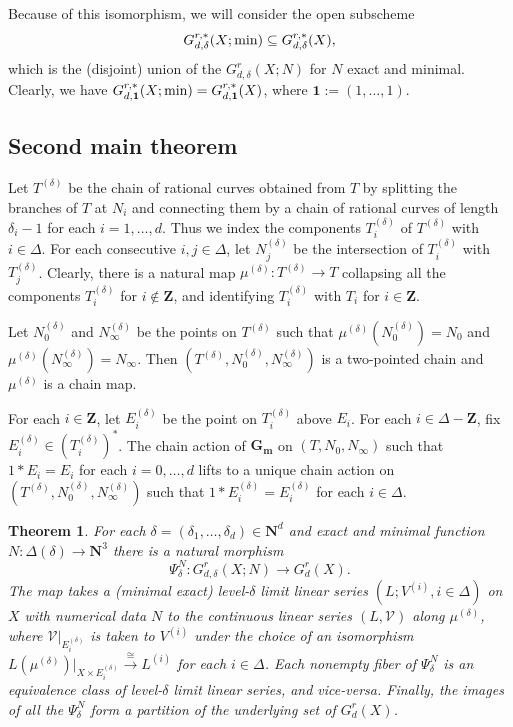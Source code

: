 \documentclass[a4paper,11pt]{amsart}
\theoremstyle{plain}
\newtheorem{thm}{Theorem}[section]
\theoremstyle{definition}
\theoremstyle{remark}
\def\cc{{\mathbf G}_{\mathbf m}}
\def\n{\mathbf{N}}
\def\V{\mathcal{V}}
\def\:{\colon}
\begin{document}
Because of this isomorphism, we will consider the open subscheme
\[
G_{d,\delta}^{r,*}(X;\text{\rm min})\subseteq G_{d,\delta}^{r,*}(X),
\]
which is the (disjoint) union of the 
$G_{d,\delta}^r(X;N)$ for $N$ exact and minimal. Clearly, we have
$G_{d,\mathbf 1}^{r,*}(X;\text{\rm min})=G_{d,\mathbf 1}^{r,*}(X)$, where $\mathbf 1:=(1,\dots,1)$.



\subsection{Second main theorem}

Let $T^{(\delta)}$ be the chain of rational curves obtained from $T$ by splitting the branches of $T$ at $N_i$ and connecting them by a chain of rational curves of length $\delta_i-1$ for each $i=1,\dots,d$. Thus we index the components $T^{(\delta)}_i$ of $T^{(\delta)}$ with $i\in\Delta$. For each consecutive  $i,j\in\Delta$, let $N^{(\delta)}_j$ be the intersection of $T^{(\delta)}_{i}$ with $T^{(\delta)}_j$. Clearly, there is a natural map $\mu^{(\delta)}\:T^{(\delta)}\to T$ collapsing all the components $T^{(\delta)}_{i}$ for $i\not\in\mathbf Z$, and identifying $T^{(\delta)}_{i}$ with $T_i$ for $i\in\mathbf Z$.

Let $N_0^{(\delta)}$ and $N_\infty^{(\delta)}$ be the points on $T^{(\delta)}$ such that $\mu^{(\delta)}(N_0^{(\delta)})=N_0$ and $\mu^{(\delta)}(N_\infty^{(\delta)})=N_\infty$. Then $(T^{(\delta)},N_0^{(\delta)},N_\infty^{(\delta)})$ is a two-pointed chain and $\mu^{(\delta)}$ is a chain map. 

For each $i\in\mathbf Z$, let $E_i^{(\delta)}$ be the point on $T_i^{(\delta)}$ above $E_i$. For each $i\in\Delta-\mathbf Z$, fix $E_i^{(\delta)}\in(T^{(\delta)}_i)^*$. The chain action of $\cc$ on $(T,N_0,N_\infty)$ such that $1\ast E_i=E_i$ for each $i=0,\dots,d$ lifts to a unique chain action on $(T^{(\delta)},N_0^{(\delta)},N_\infty^{(\delta)})$ such that $1\ast E^{(\delta)}_i=E^{(\delta)}_i$ for each $i\in\Delta$.

\begin{thm}\label{allevels} For each 
$\delta=(\delta_1,\dots,\delta_d)\in\mathbf N^d$ and exact and minimal function $N\colon\Delta(\delta)\to\n^3$
there is a natural morphism
\[
\Psi_\delta^N\:G^{r}_{d,\delta}(X;N)\longrightarrow
G_d^r(X).
\]
The map takes a (minimal exact) level-$\delta$ limit linear series $(L;V^{(i)},i\in\Delta)$ on $X$ with numerical data $N$ to the continuous linear series $(L,\V)$ along $\mu^{(\delta)}$, where $\V|_{E_i^{(\delta)}}$ is taken to $V^{(i)}$ under the choice of an isomorphism $L(\mu^{(\delta)})|_{X\times E_i^{(\delta)}}\xrightarrow{\cong} L^{(i)}$ for each $i\in\Delta$. Each nonempty fiber of $\Psi_\delta^N$ is an equivalence class of level-$\delta$ limit linear series, and vice-versa. Finally, the images of all the $\Psi_\delta^N$ form a partition of the underlying set of $G_d^r(X)$. 
\end{thm}
\end{document}
